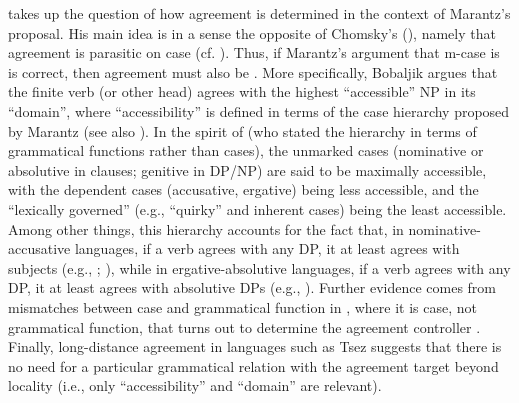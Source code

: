 \documentclass[output=paper]{langsci/langscibook}
\begin{document}
\citet{Bobaljik2008Phi} takes up the question of how agreement is determined in the context of Marantz’s proposal. His main idea is in a sense the opposite of Chomsky’s (\citeyear{Chomsky2000,Chomsky2001Derivation}), namely that agreement is parasitic on case (cf. \citealt{Bittner1996}). Thus, if Marantz’s argument that m-case is  is correct, then agreement must also be . More specifically, Bobaljik argues that the finite verb (or other head) agrees with the highest ``accessible'' NP in its ``domain'', where ``accessibility'' is defined in terms of the case hierarchy proposed by Marantz (see also \citealt{McFadden2004}). In the spirit of \citet{Moravcsik1974} (who stated the hierarchy in terms of grammatical functions rather than cases), the unmarked cases (nominative or absolutive in clauses; genitive in DP\slash NP) are said to be maximally accessible, with the dependent cases (accusative, ergative) being less accessible, and the ``lexically governed'' (e.g., ``quirky'' and inherent cases) being the least accessible. Among other things, this hierarchy accounts for the fact that, in nominative-accusative languages, if a verb agrees with any DP, it at least agrees with subjects (e.g., \citealt{Moravcsik1974}; \citealt{Gilligan1987}), while in ergative-absolutive languages, if a verb agrees with any DP, it at least agrees with absolutive DPs (e.g., \citealt{Croft1990}). Further evidence comes from mismatches between case and grammatical function in , where it is case, not grammatical function, that turns out to determine the agreement controller \citep{Sigurðsson1993}. Finally, long-distance agreement in languages such as Tsez \citep{Polinsky2001} suggests that there is no need for a particular grammatical relation with the agreement target beyond locality (i.e., only ``accessibility'' and ``domain'' are relevant).
\end{document}
